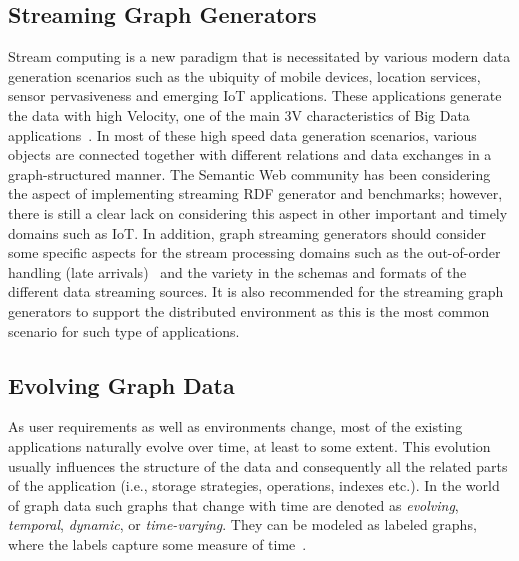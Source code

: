 \subsection{Streaming Graph Generators}
Stream computing is a new paradigm that is necessitated by various modern data generation scenarios such as the ubiquity of mobile devices, location services,
sensor pervasiveness and emerging IoT applications. These applications generate the data with high Velocity, one of the 
main 3V characteristics of Big Data applications~\cite{sakr2016big}. In most of these high speed data generation scenarios, 
various objects are connected together with different relations and data exchanges  in a graph-structured manner. The 
Semantic Web community has been considering the aspect of implementing streaming RDF generator and benchmarks; however, there is still a clear lack on considering this aspect in other important and timely domains such as IoT. %
In addition, graph streaming generators should  consider some specific aspects for the stream processing domains such as the out-of-order handling (late arrivals)~\cite{li2008out} and the variety in the schemas and formats of the different data streaming sources. It is also recommended for the streaming graph generators to support the distributed environment as this is the most common scenario for such type of applications.

\subsection{Evolving Graph Data}
\label{sec:evolving}
As user requirements as well as environments change, most of the existing
applications naturally evolve over time, at least to some extent. This evolution
usually influences the structure of the data and consequently all the related
parts of the application (i.e., storage strategies, operations, indexes etc.).
In the world of graph data such graphs that change with time are denoted as \emph{evolving}, \emph{temporal}, \emph{dynamic}, or \emph{time-varying}. They can be modeled as labeled graphs, where the labels capture some measure of time~\cite{Michail2015}.

